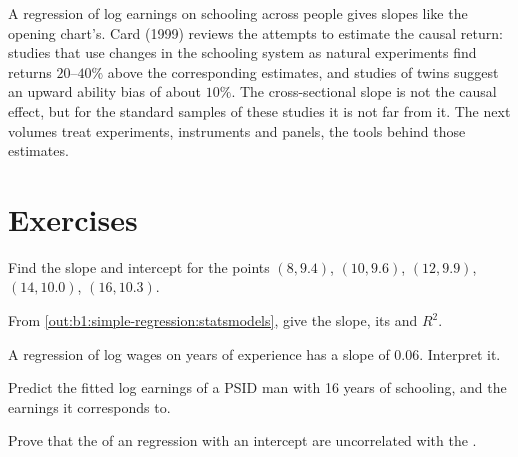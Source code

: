 \begin{record}
A regression of log earnings on schooling across people gives slopes like
the opening chart's. Card (1999) reviews the attempts to estimate the
causal return: studies that use changes in the schooling system as
natural experiments find returns $20$--$40\%$ above the corresponding 
estimates, and studies of twins suggest an upward ability bias of about
$10\%$. %
The cross-sectional slope is not the causal effect, but for the standard
samples of these studies it is not far from it. The next volumes treat experiments, instruments and
panels, the tools behind those estimates.
\end{record}

\section*{Exercises}\label{sec:b1:simple-regression:exercises}

\begin{exercise}[$\star$]\label{exo:b1:simple-regression:five}
Find the  slope and intercept for the points $(8, 9.4)$, $(10, 9.6)$, $(12, 9.9)$,
$(14, 10.0)$, $(16, 10.3)$.
\end{exercise}

\begin{exercise}[$\star$]\label{exo:b1:simple-regression:read}
From \cref{out:b1:simple-regression:statsmodels}, give the slope, its  and $R^2$.
\end{exercise}

\begin{exercise}[$\star$]\label{exo:b1:simple-regression:interpret}
A regression of log wages on years of experience has a slope of $0.06$.
Interpret it.
\end{exercise}

\begin{exercise}[$\star$]\label{exo:b1:simple-regression:predict}
Predict the fitted log earnings of a PSID man with 16 years of schooling, and
the earnings it corresponds to.
\end{exercise}

\begin{exercise}[$\star\star$]\label{exo:b1:simple-regression:residuals}
Prove that the  of an  regression with an intercept are
uncorrelated with the .
\end{exercise}

